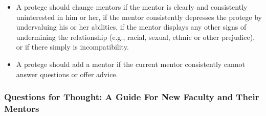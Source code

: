 
\begin{itemize}

\item
	A protege should change mentors if the mentor is clearly and consistently 
uninterested in him or her, if the mentor consistently depresses the protege by 
undervaluing his or her abilities, if the mentor displays any other signs of 
undermining the relationship (e.g., racial, sexual, ethnic or other prejudice), or if 
there simply is incompatibility.
\item
	A protege should add a mentor if the current mentor consistently cannot answer 
questions or offer advice.

\end{itemize}

\subsubsection{Questions for Thought: A Guide
For New Faculty and Their Mentors}

